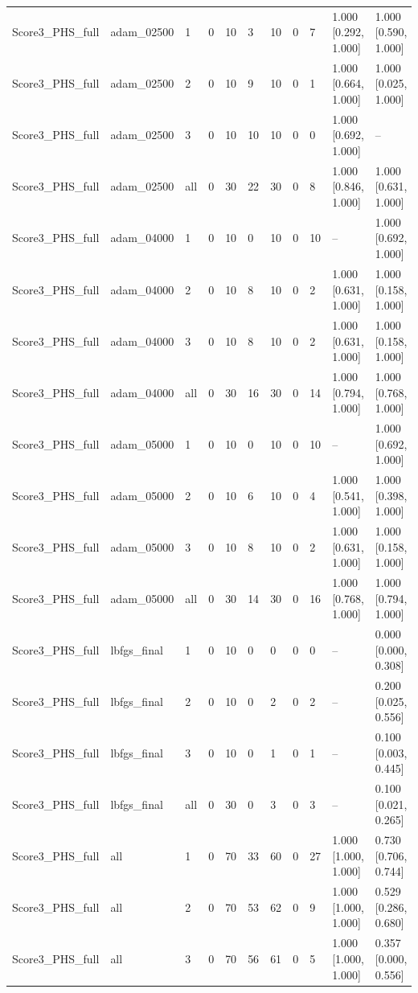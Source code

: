 \begin{longtable}{lllllllllll}
Score3\_PHS\_full & adam\_02500 & 1 & 0 & 10 & 3 & 10 & 0 & 7 & 1.000 [0.292, 1.000] & 1.000 [0.590, 1.000] \\
Score3\_PHS\_full & adam\_02500 & 2 & 0 & 10 & 9 & 10 & 0 & 1 & 1.000 [0.664, 1.000] & 1.000 [0.025, 1.000] \\
Score3\_PHS\_full & adam\_02500 & 3 & 0 & 10 & 10 & 10 & 0 & 0 & 1.000 [0.692, 1.000] & -- \\
Score3\_PHS\_full & adam\_02500 & all & 0 & 30 & 22 & 30 & 0 & 8 & 1.000 [0.846, 1.000] & 1.000 [0.631, 1.000] \\
Score3\_PHS\_full & adam\_04000 & 1 & 0 & 10 & 0 & 10 & 0 & 10 & -- & 1.000 [0.692, 1.000] \\
Score3\_PHS\_full & adam\_04000 & 2 & 0 & 10 & 8 & 10 & 0 & 2 & 1.000 [0.631, 1.000] & 1.000 [0.158, 1.000] \\
Score3\_PHS\_full & adam\_04000 & 3 & 0 & 10 & 8 & 10 & 0 & 2 & 1.000 [0.631, 1.000] & 1.000 [0.158, 1.000] \\
Score3\_PHS\_full & adam\_04000 & all & 0 & 30 & 16 & 30 & 0 & 14 & 1.000 [0.794, 1.000] & 1.000 [0.768, 1.000] \\
Score3\_PHS\_full & adam\_05000 & 1 & 0 & 10 & 0 & 10 & 0 & 10 & -- & 1.000 [0.692, 1.000] \\
Score3\_PHS\_full & adam\_05000 & 2 & 0 & 10 & 6 & 10 & 0 & 4 & 1.000 [0.541, 1.000] & 1.000 [0.398, 1.000] \\
Score3\_PHS\_full & adam\_05000 & 3 & 0 & 10 & 8 & 10 & 0 & 2 & 1.000 [0.631, 1.000] & 1.000 [0.158, 1.000] \\
Score3\_PHS\_full & adam\_05000 & all & 0 & 30 & 14 & 30 & 0 & 16 & 1.000 [0.768, 1.000] & 1.000 [0.794, 1.000] \\
Score3\_PHS\_full & lbfgs\_final & 1 & 0 & 10 & 0 & 0 & 0 & 0 & -- & 0.000 [0.000, 0.308] \\
Score3\_PHS\_full & lbfgs\_final & 2 & 0 & 10 & 0 & 2 & 0 & 2 & -- & 0.200 [0.025, 0.556] \\
Score3\_PHS\_full & lbfgs\_final & 3 & 0 & 10 & 0 & 1 & 0 & 1 & -- & 0.100 [0.003, 0.445] \\
Score3\_PHS\_full & lbfgs\_final & all & 0 & 30 & 0 & 3 & 0 & 3 & -- & 0.100 [0.021, 0.265] \\
Score3\_PHS\_full & all & 1 & 0 & 70 & 33 & 60 & 0 & 27 & 1.000 [1.000, 1.000] & 0.730 [0.706, 0.744] \\
Score3\_PHS\_full & all & 2 & 0 & 70 & 53 & 62 & 0 & 9 & 1.000 [1.000, 1.000] & 0.529 [0.286, 0.680] \\
Score3\_PHS\_full & all & 3 & 0 & 70 & 56 & 61 & 0 & 5 & 1.000 [1.000, 1.000] & 0.357 [0.000, 0.556] \\

\end{longtable}
